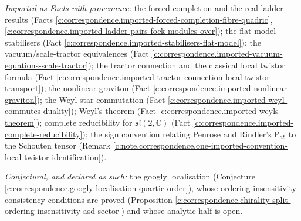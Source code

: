 \documentclass[11pt]{article}
\theoremstyle{definition}
\theoremstyle{plain}
\providecommand{\C}{}\renewcommand{\C}{\mathbb{C}}
\begin{document}
\emph{Imported as Facts with provenance:} the forced completion and the real ladder results (Facts \ref{c:correspondence.imported-forced-completion-fibre-quadric}, \ref{c:correspondence.imported-ladder-pairs-fock-modules-over}); the flat-model stabilisers (Fact \ref{c:correspondence.imported-stabilisers-flat-model}); the vacuum/scale-tractor equivalences (Fact \ref{c:correspondence.imported-vacuum-equations-scale-tractor}); the tractor connection and the classical local twistor formula (Fact \ref{c:correspondence.imported-tractor-connection-local-twistor-transport}); the nonlinear graviton (Fact \ref{c:correspondence.imported-nonlinear-graviton}); the Weyl-star commutation (Fact \ref{c:correspondence.imported-weyl-commutes-duality}); Weyl's theorem (Fact \ref{c:correspondence.imported-weyls-theorem}); complete reducibility for $\mathfrak{sl}(2,\C)$ (Fact \ref{c:correspondence.imported-complete-reducibility}); the sign convention relating Penrose and Rindler's $\mathrm{P}_{ab}$ to the Schouten tensor (Remark \ref{c:note.correspondence.one-imported-convention-local-twistor-identification}).

\emph{Conjectural, and declared as such:} the googly localisation (Conjecture \ref{c:correspondence.googly-localisation-quartic-order}), whose ordering-insensitivity consistency conditions are proved (Proposition \ref{c:correspondence.chirality-split-ordering-insensitivity-asd-sector}) and whose analytic half is open.
\end{document}
